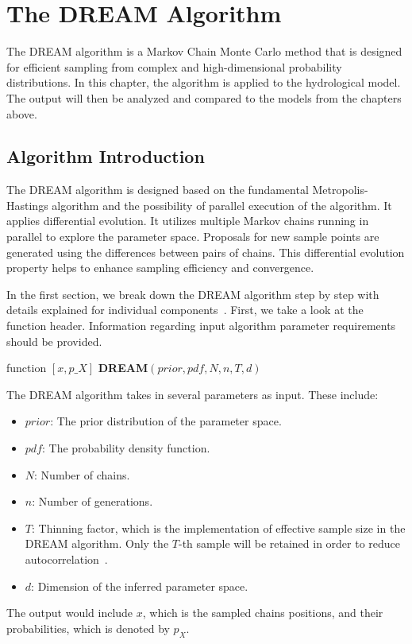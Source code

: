 \chapter{The DREAM Algorithm}
The DREAM algorithm is a Markov Chain Monte Carlo method that is designed for efficient sampling from complex and high-dimensional probability distributions. In this chapter, the algorithm is applied to the hydrological model. The output will then be analyzed and compared to the models from the chapters above.

\section{Algorithm Introduction}
The DREAM algorithm is designed based on the fundamental Metropolis-Hastings algorithm and the possibility of parallel execution of the algorithm. It applies differential evolution. It utilizes multiple Markov chains running in parallel to explore the parameter space. Proposals for new sample points are generated using the differences between pairs of chains. This differential evolution property helps to enhance sampling efficiency and convergence. 


In the first section, we break down the DREAM algorithm step by step with details explained for individual components~\cite{dream}. First, we take a look at the function header. Information regarding input algorithm parameter requirements should be provided.

\begin{algorithm}[H]
function $[x, p\_X]$ \gets \textbf{DREAM}$(prior, pdf, N, n, T, d)$
\end{algorithm}

The DREAM algorithm takes in several parameters as input. These include:
\begin{itemize}
    \item $prior$: The prior distribution of the parameter space.
    \item $pdf$: The probability density function.
    \item $N$: Number of chains.
    \item $n$: Number of generations.
    \item $T$: Thinning factor, which is the implementation of effective sample size in the DREAM algorithm. Only the $T$-th sample will be retained in order to reduce autocorrelation~\cite{dream}.
    \item $d$: Dimension of the inferred parameter space.
\end{itemize}
The output would include $x$, which is the sampled chains positions, and their probabilities, which is denoted by $p_X$.

